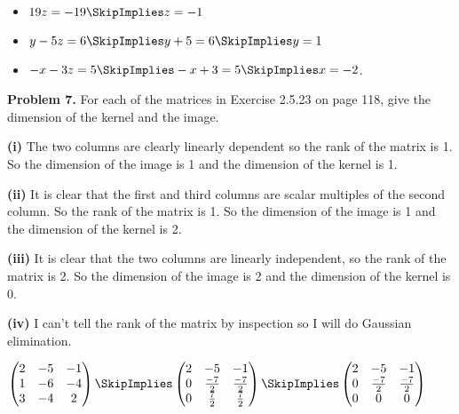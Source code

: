 \documentclass[oneside,12pt]{amsart}
\begin{document}
\begin{itemize}
\item $19z = -19 \SkipImplies z = -1$
\item $y - 5z = 6 \SkipImplies y + 5 = 6 \SkipImplies y = 1$
\item $-x -3z = 5 \SkipImplies -x + 3 = 5 \SkipImplies x = -2$.
\end{itemize}

\bigskip


\textbf{Problem 7.} For each of the matrices in Exercise 2.5.23 on page 118,
give the dimension of the kernel and the image.

\bigskip

\textbf{(i)} The two columns are clearly linearly dependent so the rank of
the matrix is 1. So the dimension of the image is 1 and the dimension of
the kernel is 1.

\bigskip

\textbf{(ii)} It is clear that the first and third columns are scalar multiples
of the second column. So the rank of the matrix is 1. So the dimension of
the image is 1 and the dimension of the kernel is 2.

\bigskip


\textbf{(iii)} It is clear that the two columns are linearly independent, so
the rank of the matrix is 2. So the dimension of the image is 2 and the dimension
of the kernel is 0.

\bigskip

\textbf{(iv)} I can't tell the rank of the matrix by inspection so I will do
Gaussian elimination.

\bigskip

$
\begin{pmatrix}
2 & -5 & -1 \\
1 & -6 & -4 \\
3 & -4 & 2
\end{pmatrix}
\SkipImplies
\begin{pmatrix}
2 & -5 & -1 \\
0 & \frac{-7}{2} & \frac{-7}{2} \\
0 & \frac{7}{2} & \frac{7}{2}
\end{pmatrix}
\SkipImplies
\begin{pmatrix}
2 & -5 & -1 \\
0 & \frac{-7}{2} & \frac{-7}{2} \\
0 & 0 & 0
\end{pmatrix}
$
\end{document}
